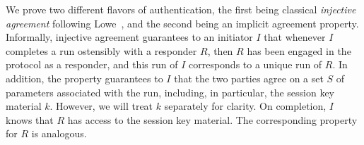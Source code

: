 
\label{sec:authenticationDef}
We prove two different flavors of authentication, the first being classical
\emph{injective agreement} following Lowe~\cite{DBLP:conf/csfw/Lowe97a}, and
the second being an implicit agreement property.
%
Informally, injective agreement guarantees to an initiator $I$ that whenever
$I$ completes a run ostensibly with a responder $R$,
then $R$ has been engaged in the protocol as a responder,
and this run of $I$ corresponds to a unique run of $R$.
%
In addition, the property guarantees to $I$ that the two parties agree on a set
$S$ of parameters associated with the run, including, in particular, the
session key material $k$.
%
However, we will treat $k$ separately for clarity.
%
On completion, $I$ knows that $R$ has access to the session key material.
%
The corresponding property for $R$ is analogous.
%

